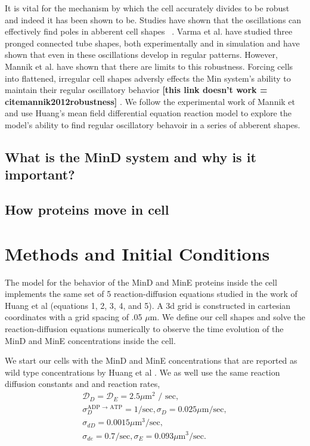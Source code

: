\documentclass[letterpaper,twocolumn,amsmath,amssymb,pre]{revtex4-1}
\newcommand{\red}[1]{{\bf \color{red} #1}}
\newcommand{\fixme}[1]{\red{[#1]}}
\begin{document}
It is vital for the mechanism by which the cell accurately divides to
be robust and indeed it has been shown to
be\cite{touhami2006temperature}.  Studies have shown that the
oscillations can effectively find poles in abberent cell
shapes~\cite{corbin2002exploring} \cite{juarez2010changes}.  Varma et
al. have studied three pronged connected tube shapes, both
experimentally and in simulation\cite{varma2008min} and have shown
that even in these oscillations develop in regular patterns. However,
Mannik et al. have shown that there are limits to this
robustness. Forcing cells into flattened, irregular cell shapes
adversly effects the Min system's ability to maintain their regular
oscillatory behavior \fixme{this link doesn't work = cite{mannik2012robustness}}
\cite{mannik2010bacteria} \cite{mannik2009bacterial}.  We follow the
experimental work of Mannik et and use Huang's mean field differential
equation reaction model to explore the model's ability to find regular
oscillatory behavoir in a series of abberent shapes.



\subsection{What is the MinD system and why is it important?}
\subsection{How proteins move in cell}
\section{Methods and Initial Conditions}
The model for the behavior of the MinD and MinE proteins inside the
cell implements the same set of 5 reaction-diffusion equations studied in
the work of Huang et al (equations 1, 2, 3, 4, and
5)\cite{huang2003dynamic}. A 3d grid is constructed in cartesian
coordinates with a grid spacing of .05 $\mu$m. We define our cell
shapes and solve the reaction-diffusion equations numerically to
observe the time evolution of the MinD and MinE concentrations inside
the cell.

We start our cells with the MinD and MinE concentrations that are
reported as wild type concentrations by Huang et al . We as well use the same reaction
diffusion constants and and reaction rates,
\begin{gather*} %
  \mathcal{D}_D = \mathcal{D}_{E}  = 2.5 \mu \textrm{m$^2$ / sec}, \\
  \sigma_D^{\textrm{ADP $\rightarrow$ ATP}}  = 1/\textrm{sec},  \sigma_D = 0.025 \mu \textrm{m/sec}, \\
  \sigma_{dD}  = 0.0015 \mu \textrm{m$^3$/sec}, \\
  \sigma_{de}  = 0.7/\textrm{sec}, \sigma_E = 0.093 \mu \textrm{m$^3$/sec}.
\end{gather*}
\end{document}
